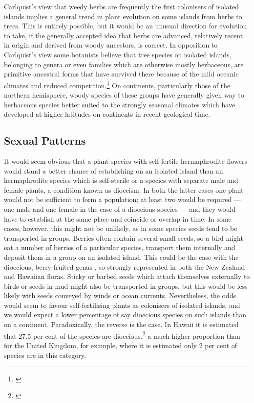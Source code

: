 Carlquist's view that weedy herbs are frequently the first colonisers of isolated islands implies a general trend in plant evolution on some islands from herbs to trees.
This is entirely possible, but it would be an unusual direction for evolution to take, if the generally accepted idea that herbs are advanced, relatively recent in origin and derived from woody ancestors, is correct.
In opposition to Carlquist's view some botanists believe that tree species on isolated islands, belonging to genera or even families which are otherwise mostly herbaceous, are primitive ancestral forms that have survived there because of the mild oceanic climates and reduced competition.\footnote{\cite{mabberley1979pachycaul}}
On continents, particularly those of the northern hemisphere, woody species of these groups have generally given way to herbaceous species better suited to the strongly seasonal climates which have developed at higher latitudes on continents in recent geological time.

\subsection{Sexual Patterns}

It would seem obvious that a plant species with self-fertile hermaphrodite flowers would stand a better chance of establishing on an isolated island than an hermaphrodite species which is self-sterile or a species with separate male and female plants, a condition known as dioecism.
In both the latter cases one plant would not be sufficient to form a population; at least two would be required — one male and one female in the case of a dioecious species — and they would have to establish at the same place and coincide or overlap in time.
In some cases, however, this might not be unlikely, as in some species seeds tend to be transported in groups.
Berries often contain several small seeds, so a bird might eat a number of berries of a particular species, transport them internally and deposit them in a group on an isolated island.
This could be the case with the dioecious, berry-fruited genus , so strongly represented in both the New Zealand and Hawaiian floras.
Sticky or barbed seeds which attach themselves externally to birds or seeds in mud might also be transported in groups, but this would be less likely with seeds conveyed by winds or ocean currents.
Nevertheless, the odds would seem to favour self-fertilising plants as colonisers of isolated islands, and we would expect a lower percentage of say dioecious species on such islands than on a continent.
Paradoxically, the reverse is the case.
In Hawai{\okina}i it is estimated that 27.5 per cent of the species are dioecious,\footnote{\cite{carlquist1970hawaii}} a much higher proportion than for the United Kingdom, for example, where it is estimated only 2 per cent of species are in this category.

